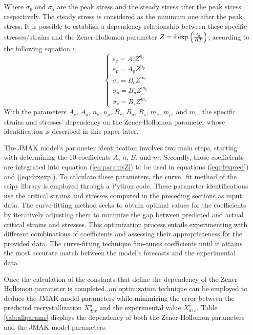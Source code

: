 \documentclass[metals,article,submit,pdftex,moreauthors]{Definitions/mdpi}
\DeclareRobustCommand{\mdot}[1]{\accentset{\mbox{\bfseries .}}{#1}}
\begin{document}
Where $\sigma_p$ and $\sigma_s$ are the peak stress and the steady stress after the peak stress respectively.
The steady stress is considered as the minimum one after the peak stress.
It is possible to establish a dependency relationship between these specific stresses/strains and the Zener-Hollomon parameter $Z = \mdot\varepsilon \exp{\left(\frac{Q}{RT}\right)} \label{eq:ArZ}$, according to the following equation \cite{chen2014dynamic,li2019effect,wang2021artificial}:
\begin{equation}
\begin{cases}
\varepsilon_c = A_cZ^{n_c} \\ \varepsilon_p = A_pZ^{n_p} \\ \sigma_c = B_cZ^{m_c} \\ \sigma_p = B_pZ^{m_p}\\ \sigma_s = B_sZ^{m_s}
\end{cases}
\label{eq:paramsZ}
\end{equation}
With the parameters $A_c$, $A_p$, $n_c$, $n_p$, $B_c$, $B_p$, $B_s$, $m_c$, $m_p$, and $m_s$, the specific strains and stresses' dependency on the Zener-Hollomon parameter whose identification is described in this paper later.

The JMAK model's parameter identification involves two main steps, starting with determining the 10 coefficients $A$, $n$, $B$, and $m$.
Secondly, those coefficients are integrated into equation (\ref{eq:paramsZ}) to be used in equations (\ref{eq:drxpred}) and (\ref{eq:drxexp}).
To calculate these parameters, the curve\_fit method of the scipy library is employed through a Python code.
These parameter identifications use the critical strains and stresses computed in the preceding sections as input data.
The curve-fitting method seeks to obtain optimal values for the coefficients by iteratively adjusting them to minimize the gap between predicted and actual critical strains and stresses.
This optimization process entails experimenting with different combinations of coefficients and assessing their appropriateness for the provided data.
The curve-fitting technique fine-tunes coefficients until it attains the most accurate match between the model's forecasts and the experimental data.

Once the calculation of the constants that define the dependency of the Zener-Hollomon parameter is completed, an optimization technique can be employed to deduce the JMAK model parameters while minimizing the error between the predicted recrystallization $X_{drx}^{p}$ and the experimental value $X_{drx}^{e}$.
Table \ref{tab:allparams} displays the dependency of both the Zener-Hollomon parameters and the JMAK model parameters.
\end{document}
